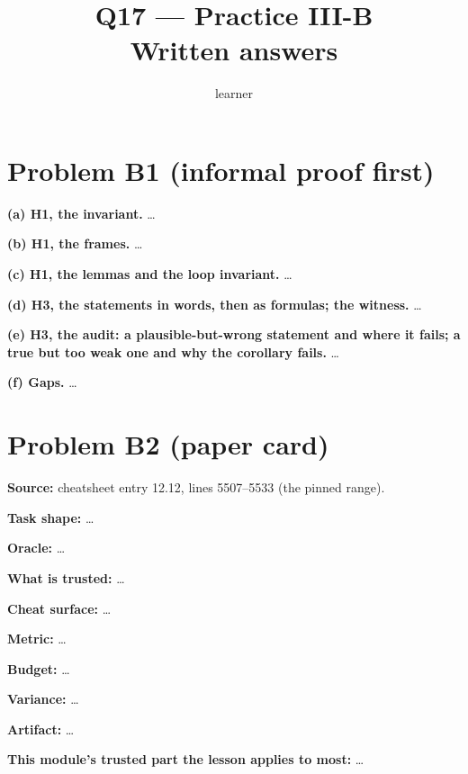 \documentclass[11pt]{article}
\title{Q17 --- Practice III-B \\ \large Written answers}
\author{learner}
\date{}
\begin{document}
\maketitle

\section*{Problem B1 (informal proof first)}\label{ans:B1}
\begin{answer}
\textbf{(a) H1, the invariant.} \dots

\textbf{(b) H1, the frames.} \dots

\textbf{(c) H1, the lemmas and the loop invariant.} \dots

\textbf{(d) H3, the statements in words, then as formulas; the witness.} \dots

\textbf{(e) H3, the audit: a plausible-but-wrong statement and where it
fails; a true but too weak one and why the corollary fails.} \dots

\textbf{(f) Gaps.} \dots
\end{answer}

\section*{Problem B2 (paper card)}\label{ans:B2}
\begin{answer}
\textbf{Source:} cheatsheet entry 12.12, lines 5507--5533 (the pinned range).

\textbf{Task shape:} \dots

\textbf{Oracle:} \dots

\textbf{What is trusted:} \dots

\textbf{Cheat surface:} \dots

\textbf{Metric:} \dots

\textbf{Budget:} \dots

\textbf{Variance:} \dots

\textbf{Artifact:} \dots

\textbf{This module's trusted part the lesson applies to most:} \dots
\end{answer}
\end{document}
